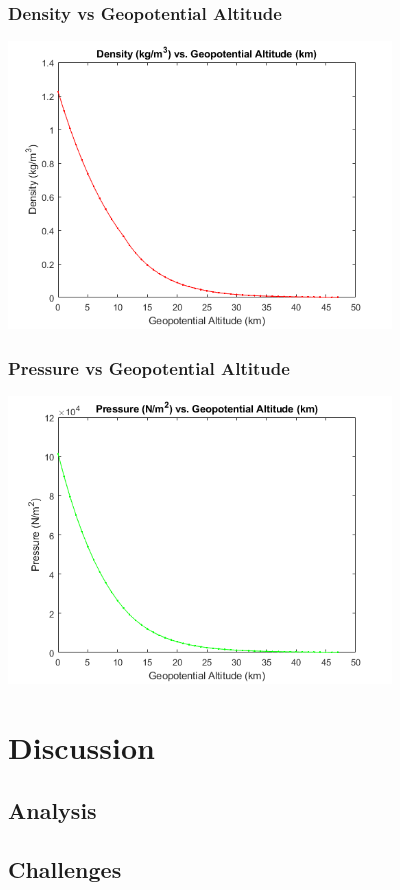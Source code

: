 \documentclass{article}
\begin{document}
\subsubsection{Density vs Geopotential Altitude}
\includegraphics [height=3in]{graph2.png}

\subsubsection{Pressure vs Geopotential Altitude}
\includegraphics [height=3in]{graph3.png}

\section{Discussion}
\subsection{Analysis}
\subsection{Challenges}
\end{document}
